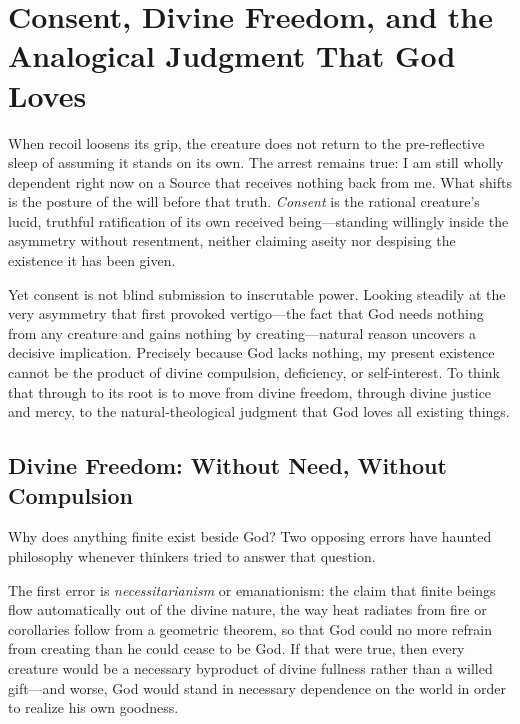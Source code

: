 \section{Consent, Divine Freedom, and the Analogical Judgment That God Loves}

When recoil loosens its grip, the creature does not return to the pre-reflective sleep of assuming it stands on its own. The arrest remains true: I am still wholly dependent right now on a Source that receives nothing back from me. What shifts is the posture of the will before that truth. \emph{Consent} is the rational creature's lucid, truthful ratification of its own received being---standing willingly inside the asymmetry without resentment, neither claiming aseity nor despising the existence it has been given.

Yet consent is not blind submission to inscrutable power. Looking steadily at the very asymmetry that first provoked vertigo---the fact that God needs nothing from any creature and gains nothing by creating---natural reason uncovers a decisive implication. Precisely because God lacks nothing, my present existence cannot be the product of divine compulsion, deficiency, or self-interest. To think that through to its root is to move from divine freedom, through divine justice and mercy, to the natural-theological judgment that God loves all existing things.

\subsection{Divine Freedom: Without Need, Without Compulsion}

Why does anything finite exist beside God? Two opposing errors have haunted philosophy whenever thinkers tried to answer that question.

The first error is \emph{necessitarianism} or emanationism: the claim that finite beings flow automatically out of the divine nature, the way heat radiates from fire or corollaries follow from a geometric theorem, so that God could no more refrain from creating than he could cease to be God. If that were true, then every creature would be a necessary byproduct of divine fullness rather than a willed gift---and worse, God would stand in necessary dependence on the world in order to realize his own goodness.

